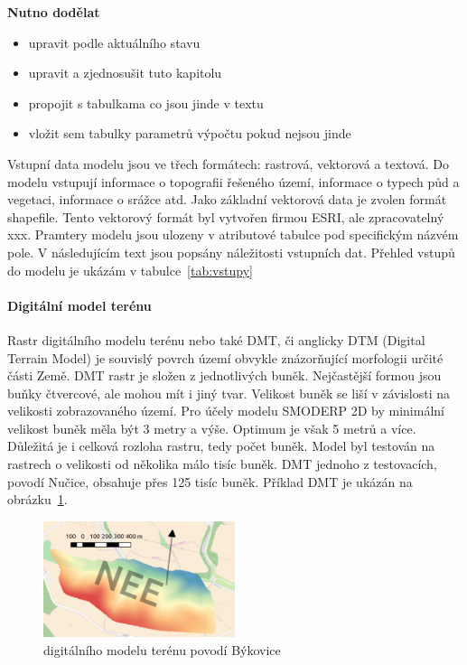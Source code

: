 
\textbf{Nutno dodělat}
\begin{itemize} \itemsep 0pt
\item upravit podle aktuálního stavu
\item upravit a zjednosušit tuto kapitolu
\item propojit s tabulkama co jsou jinde v textu
\item vložit sem tabulky parametrů výpočtu pokud nejsou jinde
\end{itemize}


Vstupní data modelu jsou ve třech formátech: rastrová, vektorová a textová. Do modelu vstupují informace o topografii řešeného území, informace o typech půd a vegetaci, informace o srážce atd. Jako základní vektorová data je zvolen formát shapefile. Tento vektorový formát byl vytvořen firmou ESRI, ale zpracovatelný xxx. Pramtery modelu jsou ulozeny v atributové tabulce pod specifickým názvém pole. 
V následujícím text jsou popsány náležitosti vstupních dat. 
% 
Přehled vstupů do modelu je ukázám v tabulce~\ref{tab:vstupy}
% 
% 

% 

\paragraph{Digitální model terénu} \label{sec:vstupdmt} 

Rastr digitálního modelu terénu nebo také DMT, či anglicky DTM (Digital Terrain Model) je souvislý povrch území obvykle znázorňující morfologii určité části Země. DMT rastr je složen z jednotlivých buněk. Nejčastější formou jsou buňky čtvercové, ale mohou mít i jiný tvar. Velikost buněk se liší v závislosti na velikosti zobrazovaného území. Pro účely modelu SMODERP 2D by minimální velikost buněk měla být 3 metry a výše. Optimum je však 5 metrů a více. Důležitá je i celková rozloha rastru, tedy počet buněk. Model byl testován na rastrech o velikosti od několika málo tisíc buněk. DMT jednoho z testovacích, povodí Nučice, obsahuje přes 125 tisíc buněk. Příklad DMT je ukázán na obrázku~\ref{fig:bykovicedmt}.

\begin{figure}
  \centering
  \includegraphics[width=0.5\textwidth]{./img/dmtbk.png}
  \caption{digitálního modelu terénu povodí Býkovice}
  \label{fig:bykovicedmt}
\end{figure}

